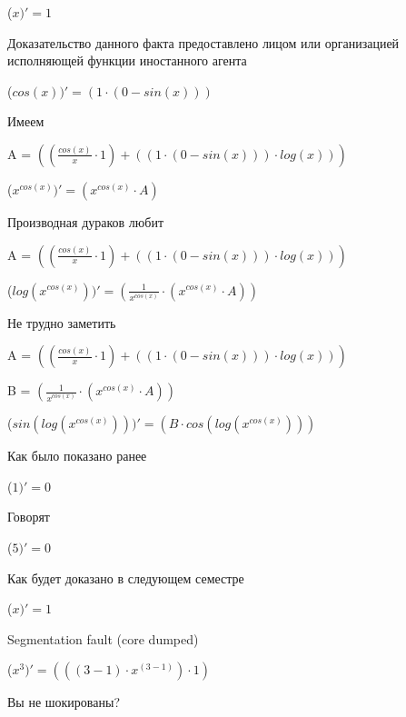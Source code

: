 \documentclass[12pt,a4paper,fleqn]{article}
\begin{document}
\begin{center}
 ($x)'
  = 1$\end{center}
Доказательство данного факта предоставлено лицом или организацией исполняющей функции иностанного агента

\begin{center}
 ($cos(x))'
  = (1 \cdot (0-sin(x)))$\end{center}
Имеем

\begin{center}
A = $((\frac{cos(x)}{x} \cdot 1)+((1 \cdot (0-sin(x))) \cdot log(x)))$\end{center}
\begin{center}
 ($x^{cos(x)})'
  = (x^{cos(x)} \cdot A)$\end{center}
Производная дураков любит

\begin{center}
A = $((\frac{cos(x)}{x} \cdot 1)+((1 \cdot (0-sin(x))) \cdot log(x)))$\end{center}
\begin{center}
 ($log(x^{cos(x)}))'
  = (\frac{1}{x^{cos(x)}} \cdot (x^{cos(x)} \cdot A))$\end{center}
Не трудно заметить

\begin{center}
A = $((\frac{cos(x)}{x} \cdot 1)+((1 \cdot (0-sin(x))) \cdot log(x)))$\end{center}
\begin{center}
B = $(\frac{1}{x^{cos(x)}} \cdot (x^{cos(x)} \cdot A))$\end{center}
\begin{center}
 ($sin(log(x^{cos(x)})))'
  = (B \cdot cos(log(x^{cos(x)})))$\end{center}
Как было показано ранее

\begin{center}
 ($1)'
  = 0$\end{center}
Говорят

\begin{center}
 ($5)'
  = 0$\end{center}
Как будет доказано в следующем семестре

\begin{center}
 ($x)'
  = 1$\end{center}
Segmentation fault (core dumped)

\begin{center}
 ($x^{3})'
  = (((3-1) \cdot x^{(3-1)}) \cdot 1)$\end{center}
Вы не шокированы?
\end{document}
